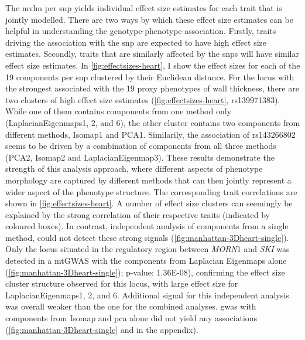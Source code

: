 %
The \gls{mvlm} per \gls{snp} yields individual effect size estimates for each trait that is jointly modelled. There are two ways by which these effect size estimates can be helpful in understanding the genotype-phenotype association. Firstly, traits driving the association with the \gls{snp} are expected to have high effect size estimates. Secondly, traits that are similarly affected by the \glspl{snp} will have similar effect size estimates.  In \cref{fig:effectsizes-heart}, I show the effect sizes for each of the \num{19} components per \gls{snp} clustered by their Euclidean distance. For the locus with the strongest associated with the \num{19} proxy phenotypes of wall thickness, there are two clusters of high effect size estimates (\cref{fig:effectsizes-heart}, rs139971383). While one of them contains components from one method only (LaplacianEigenmaps1, 2, and 6), the other cluster contains two components from different methods, Isomap1 and PCA1. Similarily, the association of rs143266802 seems to be driven by a combination of components from all three methods (PCA2, Isomap2 and LaplacianEigenmap3). These results demonstrate the strength of this analysis approach, where different aspects of phenotype morphology are captured by different methods that can then jointly represent a wider aspect of the phenotype structure. The corresponding trait correlations are shown in \cref{fig:effectsizes-heart}. A number of effect size clusters can seemingly be explained by the strong correlation of their respective traits (indicated by coloured boxes).
In contrast, independent analysis of components from a single method, could not detect these strong signals (\cref{fig:manhattan-3Dheart-single}). Only the locus situated in the regulatory region between \textit{MORN}1 and \textit{SKI} was detected in a mtGWAS with the components from Laplacian Eigenmaps alone (\cref{fig:manhattan-3Dheart-single}); p-value: \num{1.36E-08}), confirming the effect size cluster structure observed for this locus, with large effect size for LaplacianEigenmaps1, 2, and 6. Additional signal for this independent analysis was overall weaker than the one for the combined analyses. \gls{gwas} with components from Isomap and \gls{pca} alone did not yield any associations (\cref{fig:manhattan-3Dheart-single} and  in the appendix). 
%
